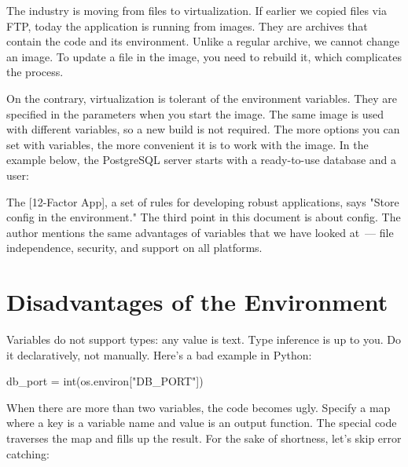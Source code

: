 
The industry is moving from files to virtualization. If earlier we copied files via FTP, today the application is running from images. They are archives that contain the code and its environment. Unlike a regular archive, we cannot change an image. To update a file in the image, you need to rebuild it, which complicates the process.


On the contrary, virtualization is tolerant of the environment variables. They are specified in the parameters when you start the image. The same image is used with different variables, so a new build is not required. The more options you can set with variables, the more convenient it is to work with the image. In the example below, the PostgreSQL server starts with a ready-to-use database and a user:



The [12-Factor App], a set of rules for developing robust applications, says "Store config in the environment." The third point in this document is about config. The author mentions the same advantages of variables that we have looked at~--- file independence, security, and support on all platforms.

\section{Disadvantages of the Environment}

\index{declarativity}

Variables do not support types: any value is text. Type inference is up to you. Do it declaratively, not manually. Here's a bad example in Python:


\begin{python}
db_port = int(os.environ["DB_PORT"])
\end{python}

When there are more than two variables, the code becomes ugly. Specify a map where a key is a variable name and value is an output function. The special code traverses the map and fills up the result. For the sake of shortness, let's skip error catching:

